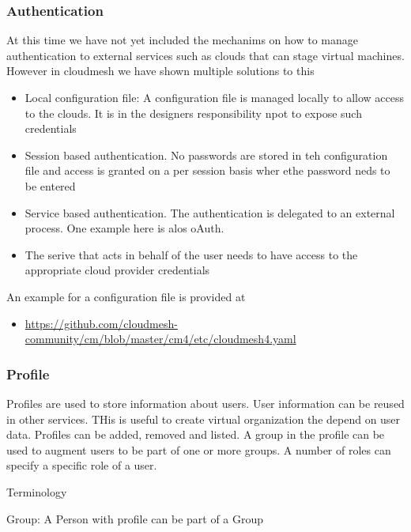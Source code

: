 \documentclass[9pt,]{article}
\providecommand{\tightlist}{%
  \setlength{\itemsep}{0pt}\setlength{\parskip}{0pt}}
\begin{document}
\hypertarget{authentication}{%
\subsubsection{Authentication}\label{authentication}}

At this time we have not yet included the mechanims on how to manage
authentication to external services such as clouds that can stage
virtual machines. However in cloudmesh we have shown multiple solutions
to this

\begin{itemize}
\tightlist
\item
  Local configuration file: A configuration file is managed locally to
  allow access to the clouds. It is in the designers responsibility npot
  to expose such credentials
\item
  Session based authentication. No passwords are stored in teh
  configuration file and access is granted on a per session basis wher
  ethe password neds to be entered
\item
  Service based authentication. The authentication is delegated to an
  external process. One example here is alos oAuth.
\item
  The serive that acts in behalf of the user needs to have access to the
  appropriate cloud provider credentials
\end{itemize}

An example for a configuration file is provided at

\begin{itemize}
\tightlist
\item
  \url{https://github.com/cloudmesh-community/cm/blob/master/cm4/etc/cloudmesh4.yaml}
\end{itemize}

\hypertarget{profile}{%
\subsubsection{Profile}\label{profile}}

Profiles are used to store information about users. User information can
be reused in other services. THis is useful to create virtual
organization the depend on user data. Profiles can be added, removed and
listed. A group in the profile can be used to augment users to be part
of one or more groups. A number of roles can specify a specific role of
a user.

Terminology

Group: A Person with profile can be part of a Group
\end{document}
